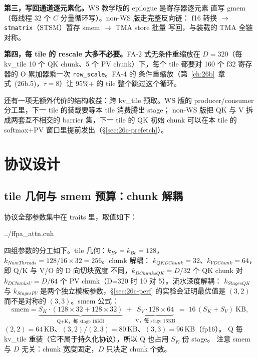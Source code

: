 \textbf{第三，写回通道逐元素化。}WS 教学版的 epilogue 是寄存器逐元素
直写 gmem（每线程 32 个 $C$ 分量循环写）。non-WS 版走完整反向链：
f16 转换 $\to$ \texttt{stmatrix}（STSM）暂存 smem $\to$ TMA store 批量
写回，与装载的 TMA 全链对称。

\textbf{第四，每 tile 的 rescale 大多不必要。}FA-2 式无条件重缩放在
$D{=}320$（每 kv\_tile 10 个 QK chunk、5 个 PV chunk）下，每个 tile
都要对 160 个 f32 寄存器的 O 累加器乘一次 \texttt{row\_scale}。FA-4 的
条件重缩放（第~\ref{ch:26b}~章式~(26b.5)，$\tau = 8$）让 95\%+ 的 tile
整个跳过这个循环。

还有一项无额外代价的结构收益：跨 kv\_tile 预取。WS 版的
producer/consumer 分工里，下一 tile 的装载要等本 tile 消费腾出 stage；
non-WS 版把 QK 与 V 拆成两套互不相交的 barrier 集，下一 tile 的 QK
初始 chunk 可以在本 tile 的 softmax+PV 窗口里提前发出（\S\ref{sec:26c-prefetch}）。

\section{协议设计}

\subsection{tile 几何与 smem 预算：chunk 解耦}\label{sec:26c-tile}

协议全部参数集中在 traits 里，取值如下：

\begin{lstinputlisting}[linerange={701-722},firstnumber=auto,
  title={ffpa\_attn.cuh L701-722（traits：协议参数与 smem 公式）}]{../ffpa_attn.cuh}
\end{lstinputlisting}

四组参数的分工如下。tile 几何：$k_{Br}{=}k_{Bc}{=}128$，
$k_{NumThreads} = 128/16 \times 32 = 256$。chunk 解耦：
$k_{QKDChunk}{=}32$、$k_{VDChunk}{=}64$，即 Q/K 与 V/O 的 D 向切块宽度
不同，$k_{DChunksQK} = D/32$ 个 QK chunk 对 $k_{DChunksV} = D/64$ 个
PV chunk（D=320 时 10 对 5）。流水深度解耦：
$k_{StagesQK}$ 与 $k_{StagesPV}$ 是两个独立模板参数，\S\ref{sec:26c-perf}
的实验会证明最优值是 $(3,2)$ 而不是对称的 $(3,3)$。smem 公式：
\begin{equation}\label{eq:26c-smem}
  \text{smem} = \underbrace{S_K \cdot (128{\times}32 + 128{\times}32)}_{\text{Q+K，每 stage }16\text{KB}}
  \;+\; \underbrace{S_V \cdot 128{\times}64}_{\text{V，每 stage }16\text{KB}}
  \;=\; 16\,(S_K + S_V)\ \text{KB} ,
\end{equation}
$(2,2){=}64$\,KB、$(3,2)/(2,3){=}80$\,KB、$(3,3){=}96$\,KB（fp16）。
Q 每 kv\_tile 重装（它不属于持久化协议），所以 Q 也占用 $S_K$ 份 stage。
注意 smem 与 $D$ 无关：chunk 宽度固定，$D$ 只决定 chunk 个数。

